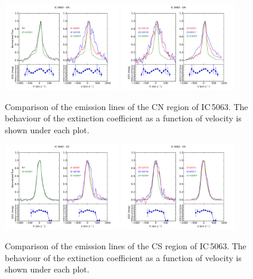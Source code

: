 \documentclass[../thesis.tex]{subfiles}
\begin{document}
\begin{figure}
\centering
\includegraphics[width=0.45\textwidth]{images/paper1/IC5063_cn_l1.pdf} \quad
\includegraphics[width=0.45\textwidth]{images/paper1/IC5063_cn_l2.pdf}\\
\caption[]{Comparison of the emission lines of the CN region of IC\,5063. The behaviour of the extinction coefficient as a function of velocity is shown under each plot.}
\label{fig:cnl1_I}
\end{figure}

\begin{figure}
\centering
\includegraphics[width=0.45\textwidth]{images/paper1/IC5063_cs_l1.pdf} \quad
\includegraphics[width=0.45\textwidth]{images/paper1/IC5063_cs_l2.pdf}\\
\caption[]{Comparison of the emission lines of the CS region of IC\,5063. The behaviour of the extinction coefficient as a function of velocity is shown under each plot.}
\label{fig:csl1_I}
\end{figure}
\end{document}
